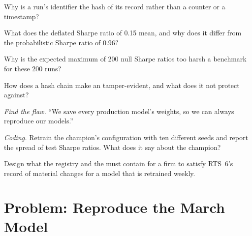 \begin{exercise}[$\star$]\label{exo:ml:experiment-tracking-and-reproducibility:2}
Why is a run's identifier the hash of its record rather than a counter or a timestamp?
\end{exercise}

\begin{exercise}[$\star$]\label{exo:ml:experiment-tracking-and-reproducibility:3}
What does the deflated Sharpe ratio of 0.15 mean, and why does it differ from the probabilistic Sharpe ratio of 0.96?
\end{exercise}

\begin{exercise}[$\star\star$]\label{exo:ml:experiment-tracking-and-reproducibility:4}
Why is the expected maximum of 200 null Sharpe ratios too harsh a benchmark for these 200 runs?
\end{exercise}

\begin{exercise}[$\star\star$]\label{exo:ml:experiment-tracking-and-reproducibility:5}
How does a hash chain make an  tamper-evident, and what does it not protect against?
\end{exercise}

\begin{exercise}[$\star\star$]\label{exo:ml:experiment-tracking-and-reproducibility:6}
\emph{Find the flaw.} ``We save every production model's weights, so we can always reproduce our models.''
\end{exercise}

\begin{exercise}[$\star\star\star$]\label{exo:ml:experiment-tracking-and-reproducibility:7}
\emph{Coding.} Retrain the champion's configuration with ten different seeds and report the spread of test Sharpe ratios.
What does it say about the champion?
\end{exercise}

\begin{exercise}[$\star\star\star$]\label{exo:ml:experiment-tracking-and-reproducibility:8}
Design what the registry and the  must contain for a firm to satisfy RTS~6's record of material changes for a model
that is retrained weekly.
\end{exercise}

\section{Problem: Reproduce the March Model}

